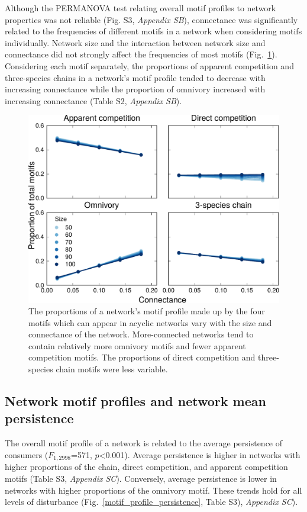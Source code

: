 \documentclass[12pt]{article}
\begin{document}
\begin{spacing}{2.0}
        Although the PERMANOVA test relating overall motif profiles to network properties was not reliable (Fig. S3, \emph{Appendix SB}), 
        connectance was significantly related to the frequencies of different motifs in a network when considering motifs individually.
        Network size and the interaction between network size and connectance did not strongly affect the frequencies of most motifs (Fig.~\ref{motif_proportion_lms}).
        Considering each motif separately, the proportions of apparent competition and three-species chains in a network's motif profile tended to decrease with increasing connectance while the proportion of omnivory increased with increasing connectance (Table S2, \emph{Appendix SB}). 
    
        \begin{figure}[h!]
            \centering
            \includegraphics[width=.75\textwidth]{manuscript/figures/motif_proportion_lms.pdf}
            \caption{The proportions of a network's motif profile made up by the four motifs which can appear in acyclic networks vary with the size and connectance of the network. More-connected networks tend to contain relatively more omnivory motifs and fewer apparent competition motifs. The proportions of direct competition and three-species chain motifs were less variable.}
            \label{motif_proportion_lms}
        \end{figure}

    \clearpage

    \subsection*{Network motif profiles and network mean persistence}
    
        The overall motif profile of a network is related to the average persistence of consumers ($F_{1,2998}$=571, $p$\textless0.001). Average persistence is higher in networks with higher proportions of the chain, direct competition, and apparent competition motifs (Table S3, \emph{Appendix SC}). Conversely, average persistence is lower in networks with higher proportions of the omnivory motif. These trends hold for all levels of disturbance (Fig.~\ref{motif_profile_persistence}, Table S3), \emph{Appendix SC}).%


\end{spacing}
\end{document}
